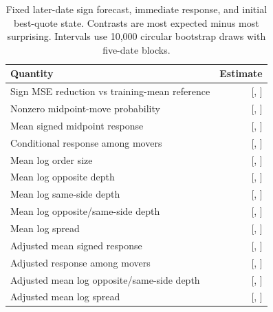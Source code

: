 \documentclass[11pt,a4paper]{article}
\begin{document}
\begin{table}[H]
  \centering
  \small
  \caption{Fixed later-date sign forecast, immediate response, and initial
  best-quote state. Contrasts are most expected minus most surprising.
  Intervals use 10,000 circular bootstrap draws with five-date blocks.}
  \label{tab:asymmetric-liquidity}
  \begin{tabular}{p{}r}
    \toprule
    Quantity & Estimate \\
    \midrule
    Sign MSE reduction vs training-mean reference &
      \SignArMseReduction{} [\SignArMseLower{}, \SignArMseUpper{}] \\
    Nonzero midpoint-move probability &
      \ObservedMoveContrast{} [\ObservedMoveLower{}, \ObservedMoveUpper{}] \\
    Mean signed midpoint response &
      \MidpointResponseContrast{} [\MidpointResponseLower{},
      \MidpointResponseUpper{}] \\
    Conditional response among movers &
      \ConditionalResponseContrast{} [\ConditionalResponseLower{},
      \ConditionalResponseUpper{}] \\
    Mean log order size &
      \OrderSizeContrast{} [\OrderSizeLower{}, \OrderSizeUpper{}] \\
    Mean log opposite depth &
      \OppositeDepthContrast{}
      [\OppositeDepthLower{}, \OppositeDepthUpper{}] \\
    Mean log same-side depth &
      \SameSideDepthContrast{} [\SameSideDepthLower{},
      \SameSideDepthUpper{}] \\
    Mean log opposite/same-side depth &
      \DepthAsymmetryContrast{} [\DepthAsymmetryLower{},
      \DepthAsymmetryUpper{}] \\
    Mean log spread &
      \LogSpreadContrast{} [\LogSpreadLower{}, \LogSpreadUpper{}] \\
    Adjusted mean signed response &
      \IntradayMidpointResponseContrast{} [\IntradayMidpointResponseLower{},
      \IntradayMidpointResponseUpper{}] \\
    Adjusted response among movers &
      \IntradayConditionalResponseContrast{}
      [\IntradayConditionalResponseLower{},
      \IntradayConditionalResponseUpper{}] \\
    Adjusted mean log opposite/same-side depth &
      \IntradayDepthAsymmetryContrast{} [\IntradayDepthAsymmetryLower{},
      \IntradayDepthAsymmetryUpper{}] \\
    Adjusted mean log spread &
      \IntradayLogSpreadContrast{} [\IntradayLogSpreadLower{},
      \IntradayLogSpreadUpper{}] \\
    \bottomrule
  \end{tabular}
\end{table}
\end{document}
